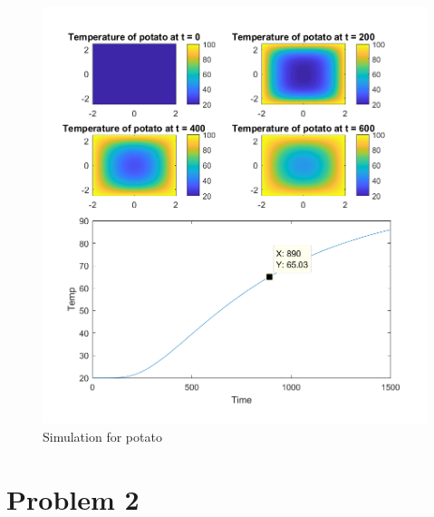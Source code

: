 \documentclass[12pt]{article}
\begin{document}
\newpage
\begin{figure}[h]
\begin{center}
\includegraphics[width=.8\textwidth]{potato}
\end{center}
\caption{Simulation for potato} \label{fig::MyFigure}
\end{figure}

\newpage
\section{Problem 2}\label{sec::Problem 2}
\end{document}
